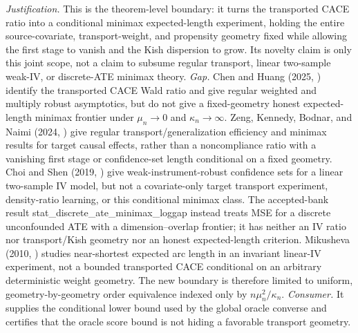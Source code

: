 \documentclass{article}
\begin{document}
\par\smallskip\noindent \textit{Justification.} This is the theorem-level boundary: it turns the transported CACE ratio into a conditional minimax expected-length experiment, holding the entire source-covariate, transport-weight, and propensity geometry fixed while allowing the first stage to vanish and the Kish dispersion to grow. Its novelty claim is only this joint scope, not a claim to subsume regular transport, linear two-sample weak-IV, or discrete-ATE minimax theory. \textit{Gap.} Chen and Huang (2025, \cite{ChenHuang2025}) identify the transported CACE Wald ratio and give regular weighted and multiply robust asymptotics, but do not give a fixed-geometry honest expected-length minimax frontier under \(\mu_n\to0\) and \(\kappa_n\to\infty\). Zeng, Kennedy, Bodnar, and Naimi (2024, \cite{ZengKennedyBodnarNaimi2024}) give regular transport/generalization efficiency and minimax results for target causal effects, rather than a noncompliance ratio with a vanishing first stage or confidence-set length conditional on a fixed geometry. Choi and Shen (2019, \cite{ChoiShen2019}) give weak-instrument-robust confidence sets for a linear two-sample IV model, but not a covariate-only target transport experiment, density-ratio learning, or this conditional minimax class. The accepted-bank result stat\_discrete\_ate\_minimax\_loggap instead treats MSE for a discrete unconfounded ATE with a dimension--overlap frontier; it has neither an IV ratio nor transport/Kish geometry nor an honest expected-length criterion. Mikusheva (2010, \cite{Mikusheva2010}) studies near-shortest expected arc length in an invariant linear-IV experiment, not a bounded transported CACE conditional on an arbitrary deterministic weight geometry. The new boundary is therefore limited to uniform, geometry-by-geometry order equivalence indexed only by \(n\mu_n^2/\kappa_n\). \textit{Consumer.} It supplies the conditional lower bound used by the global oracle converse and certifies that the oracle score bound is not hiding a favorable transport geometry.
\end{document}
